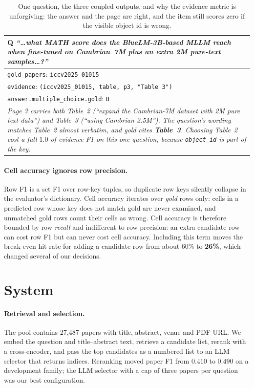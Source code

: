 \documentclass[11pt]{article}
\newcommand{\bk}{\allowbreak}
\begin{document}
\begin{table}[t]
\centering\small
\setlength{\tabcolsep}{3pt}
\begin{tabular}{@{}p{}@{}}
\toprule
\textbf{Q} \emph{``\ldots what MATH score does the BlueLM-3B-based MLLM reach
when fine-tuned on Cambrian~7M plus an extra 2M pure-text samples\ldots?''}\\[2pt]
\midrule
\texttt{gold\_papers}: \texttt{iccv2025\_01015} \\
\texttt{evidence}: \texttt{(iccv2025\_01015, table, p3, "Table 3")} \\
\texttt{answer.\bk{}multiple\_\bk{}choice.\bk{}gold}: \texttt{B} \\[3pt]
\emph{Page 3 carries both Table~2 (``expand the Cambrian-7M dataset with 2M pure
text data'') and Table~3 (``using Cambrian 2.5M''). The question's wording matches
Table~2 almost verbatim, and gold cites \textbf{Table~3}. Choosing Table~2 cost
a full $1.0$ of evidence F1 on this one question, because
\texttt{object\_id} is part of the key.}\\
\bottomrule
\end{tabular}
\caption{One question, the three coupled outputs, and why the evidence metric is
unforgiving: the answer and the page are right, and the item still scores zero if
the visible object id is wrong.}
\label{tab:example}
\end{table}

\paragraph{Cell accuracy ignores row precision.}
Row F1 is a set F1 over row-key tuples, so duplicate row keys silently collapse
in the evaluator's dictionary. Cell accuracy iterates over \emph{gold} rows only:
cells in a predicted row whose key does not match gold are never examined, and
unmatched gold rows count their cells as wrong. Cell accuracy is therefore
bounded by row \emph{recall} and indifferent to row precision: an extra
candidate row can cost row F1 but can never cost cell accuracy. Including this
term moves the break-even hit rate for adding a candidate row from about 60\% to
\textbf{26\%}, which changed several of our decisions.

\section{System}
\label{sec:system}

\paragraph{Retrieval and selection.}
The pool contains 27{,}487 papers with title, abstract, venue and PDF URL. We
embed the question and title--abstract text, retrieve a candidate list, rerank
with a cross-encoder, and pass the top candidates as a numbered list to an LLM
selector that returns indices. Reranking moved paper F1 from $0.410$ to $0.490$
on a development family; the LLM selector with a cap of three papers per question
was our best configuration.
\end{document}
